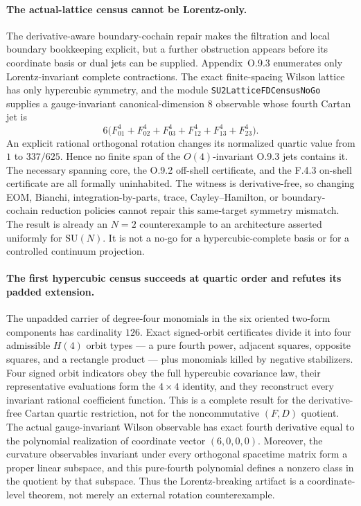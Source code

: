 \documentclass[11pt]{article}
\theoremstyle{definition}
\begin{document}
\paragraph{The actual-lattice census cannot be Lorentz-only.}
The derivative-aware boundary-cochain repair makes the filtration and local
boundary bookkeeping explicit, but a further obstruction appears before its
coordinate basis or dual jets can be supplied. Appendix~O.9.3 enumerates only
Lorentz-invariant complete contractions. The exact finite-spacing Wilson
lattice has only hypercubic symmetry, and the module
\texttt{SU2LatticeFDCensusNoGo} supplies a gauge-invariant canonical-dimension
$8$ observable whose fourth Cartan jet is
\[
  6\bigl(F_{01}^{4}+F_{02}^{4}+F_{03}^{4}
      +F_{12}^{4}+F_{13}^{4}+F_{23}^{4}\bigr).
\]
An explicit rational orthogonal rotation changes its normalized quartic value
from $1$ to $337/625$. Hence no finite span of the $O(4)$-invariant O.9.3 jets
contains it. The necessary spanning core, the O.9.2 off-shell certificate, and
the F.4.3 on-shell certificate are all formally uninhabited. The witness is
derivative-free, so changing EOM, Bianchi, integration-by-parts, trace,
Cayley--Hamilton, or boundary-cochain reduction policies cannot repair this
same-target symmetry mismatch. The result is already an $N=2$ counterexample
to an architecture asserted uniformly for $\mathrm{SU}(N)$. It is not a no-go
for a hypercubic-complete basis or for a controlled continuum projection.

\paragraph{The first hypercubic census succeeds at quartic order and refutes
its padded extension.}
The unpadded carrier of degree-four monomials in the six oriented two-form
components has cardinality $126$. Exact signed-orbit certificates divide it
into four admissible $H(4)$ orbit types --- a pure fourth power, adjacent
squares, opposite squares, and a rectangle product --- plus monomials killed
by negative stabilizers. Four signed orbit indicators obey the full
hypercubic covariance law, their representative evaluations form the
$4\times4$ identity, and they reconstruct every invariant rational
coefficient function. This is a complete result for the derivative-free
Cartan quartic restriction, not for the noncommutative $(F,D)$ quotient.
The actual gauge-invariant Wilson observable has exact fourth derivative equal
to the polynomial realization of coordinate vector $(6,0,0,0)$. Moreover, the
curvature observables invariant under every orthogonal spacetime matrix form a
proper linear subspace, and this pure-fourth polynomial defines a nonzero
class in the quotient by that subspace. Thus the Lorentz-breaking artifact is a
coordinate-level theorem, not merely an external rotation counterexample.
\end{document}
